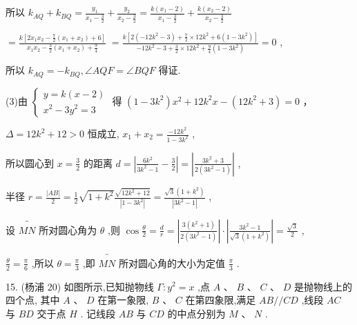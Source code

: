 \documentclass[10pt]{article}
\begin{document}
所以 \({k}_{AQ} + {k}_{BQ} = \frac{{y}_{1}}{{x}_{1} - \frac{3}{2}} + \frac{{y}_{2}}{{x}_{2} - \frac{3}{2}} = \frac{k\left( {{x}_{1} - 2}\right) }{{x}_{1} - \frac{3}{2}} + \frac{k\left( {{x}_{2} - 2}\right) }{{x}_{2} - \frac{3}{2}}\)

\(= \frac{k\left\lbrack  {2{x}_{1}{x}_{2} - \frac{7}{2}\left( {{x}_{1} + {x}_{2}}\right)  + 6}\right\rbrack  }{{x}_{1}{x}_{2} - \frac{3}{2}\left( {{x}_{1} + {x}_{2}}\right)  + \frac{9}{4}} \; = \frac{k\left\lbrack  {2\left( {-{12}{k}^{2} - 3}\right)  + \frac{7}{2} \times  {12}{k}^{2} + 6\left( {1 - 3{k}^{2}}\right) }\right\rbrack  }{-{12}{k}^{2} - 3 + \frac{3}{2} \times  {12}{k}^{2} + \frac{9}{4}\left( {1 - 3{k}^{2}}\right) } = 0\) ,

所以 \({k}_{AQ} =  - {k}_{BQ},\angle {AQF} = \angle {BQF}\) 得证.

(3)由 \(\left\{  \begin{array}{l} y = k\left( {x - 2}\right) \\  {x}^{2} - 3{y}^{2} = 3 \end{array}\right.\) 得 \(\left( {1 - 3{k}^{2}}\right) {x}^{2} + {12}{k}^{2}x - \left( {{12}{k}^{2} + 3}\right)  = 0\) ，

\(\Delta  = {12}{k}^{2} + {12} > 0\) 恒成立, \({x}_{1} + {x}_{2} = \frac{-{12}{k}^{2}}{1 - 3{k}^{2}}\) ,

所以圆心到 \(x = \frac{3}{2}\) 的距离 \(d = \left| {\frac{6{k}^{2}}{3{k}^{2} - 1} - \frac{3}{2}}\right|  = \left| \frac{3{k}^{2} + 3}{2\left( {3{k}^{2} - 1}\right) }\right|\) ,

半径 \(r = \frac{\left| AB\right| }{2} = \frac{1}{2}\sqrt{1 + {k}^{2}}\frac{\sqrt{{12}{k}^{2} + {12}}}{\left| 1 - 3{k}^{2}\right| } = \frac{\sqrt{3}\left( {1 + {k}^{2}}\right) }{\left| 3{k}^{2} - 1\right| }\) ,

设 \(\overset{\text{ ⏜ }}{MN}\) 所对圆心角为 \(\theta\) ,则 \(\cos \frac{\theta }{2} = \frac{d}{r} = \left| \frac{3\left( {{k}^{2} + 1}\right) }{2\left( {3{k}^{2} - 1}\right) }\right|  \cdot  \left| \frac{3{k}^{2} - 1}{\sqrt{3}\left( {1 + {k}^{2}}\right) }\right|  = \frac{\sqrt{3}}{2}\) ,

\(\frac{\theta }{2} = \frac{\pi }{6}\) ,所以 \(\theta  = \frac{\pi }{3}\) ,即 \(\overset{\text{ ⏜ }}{MN}\) 所对圆心角的大小为定值 \(\frac{\pi }{3}\) .

15. (杨浦 20) 如图所示,已知抛物线 \(\Gamma  : {y}^{2} = x\) ,点 \(A\text{ 、 }B\text{ 、 }C\text{ 、 }D\) 是抛物线上的四个点, 其中 \(A\text{ 、 }D\) 在第一象限, \(B\text{ 、 }C\) 在第四象限,满足 \({AB}//{CD}\) ,线段 \({AC}\) 与 \({BD}\) 交于点 \(H\) . 记线段 \({AB}\) 与 \({CD}\) 的中点分别为 \(M\text{ 、 }N\) .
\end{document}
